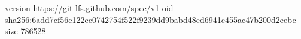 version https://git-lfs.github.com/spec/v1
oid sha256:6add7cf56e122ec0742754f522f9239dd9babd48ed6941c455ac47b200d2eebc
size 786528
